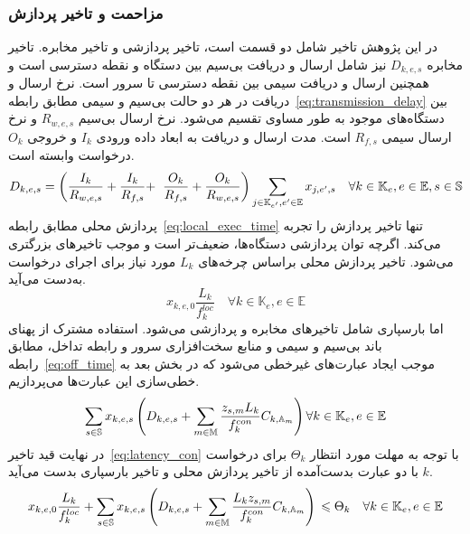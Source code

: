\subsubsection{مزاحمت و تاخیر پردازش} \label{subsubsec:latency}
در این پژوهش تاخیر شامل دو قسمت است، تاخیر پردازشی و تاخیر مخابره. تاخیر مخابره $D_{k,e,s}$ نیز شامل ارسال و دریافت بی‌سیم بین دستگاه و نقطه دسترسی است و همچنین ارسال و دریافت سیمی بین نقطه دسترسی تا سرور است. نرخ ارسال و دریافت در هر دو حالت بی‌سیم و سیمی مطابق رابطه~\eqref{eq:transmission_delay} بین دستگاه‌های موجود به طور مساوی تقسیم می‌شود. نرخ ارسال بی‌سیم $R_{w,e,s}$ و نرخ ارسال سیمی $R_{f,s}$ است. مدت ارسال و دریافت به ابعاد داده ورودی $I_k$ و خروجی $O_k$ درخواست وابسته است.
\begin{equation} \label{eq:transmission_delay}
    D_{k,e,s} = \left(\frac{I_k}{R_{w,e,s}} + \frac{I_k}{R_{f,s}} + \right. \\ \left. \frac{O_k}{R_{f,s}} + \frac{O_k}{R_{w,e,s}} \right) \sum_{j \in \mathbb{K}_{e'}, e' \in \mathbb{E}} x_{j,e',s}  \quad \forall k \in \mathbb{K}_e, e \in \mathbb{E}, s \in \mathbb{S}
\end{equation}
پردازش محلی مطابق رابطه~\eqref{eq:local_exec_time} تنها تاخیر پردازش را تجربه می‌کند. اگرچه توان پردازشی دستگاه‌ها، ضعیف‌تر است و موجب تاخیرهای بزرگتری می‌شود. تاخیر پردازش محلی براساس چرخه‌های $L_k$ مورد نیاز برای اجرای درخواست به‌دست می‌آید. 
\begin{equation} \label{eq:local_exec_time}
    x_{k,e,0}\frac{L_k}{f^{loc}_k} \quad \forall k \in \mathbb{K}_e, e \in \mathbb{E}
\end{equation}
اما بارسپاری شامل تاخیرهای مخابره و پردازشی می‌شود. استفاده مشترک از پهنای باند بی‌سیم و سیمی و منابع سخت‌افزاری سرور و رابطه تداخل، مطابق رابطه~\eqref{eq:off_time} موجب ایجاد عبارت‌های غیرخطی می‌شود که در بخش بعد به خطی‌سازی این عبارت‌ها می‌پردازیم.
\begin{equation} \label{eq:off_time}
    \sum_{s \in \mathbb{S}} x_{k,e,s} \left(D_{k,e,s} + \sum_{m \in \mathbb{M}} \frac{z_{s,m} L_k}{f^{con}_k} C_{k,\mathbb{A}_m}\right) \\ \forall k \in \mathbb{K}_e, e \in \mathbb{E}
\end{equation}
در نهایت قید تاخیر~\eqref{eq:latency_con} با توجه به مهلت مورد انتظار $\Theta_k$ برای درخواست $k$ با دو عبارت بدست‌آمده از تاخیر پردازش محلی و تاخیر بارسپاری بدست می‌آید.
\begin{equation} \label{eq:latency_con}
    x_{k,e,0}\frac{L_k}{f^{loc}_k} + \sum_{s \in \mathbb{S}} x_{k,e,s} \left(D_{k,e,s} + \sum_{m \in \mathbb{M}}\frac{L_k z_{s,m}}{f^{con}_k} C_{k,\mathbb{A}_m}\right) \\ \leq \Theta_k \quad \forall k \in \mathbb{K}_e, e \in \mathbb{E}
\end{equation}

